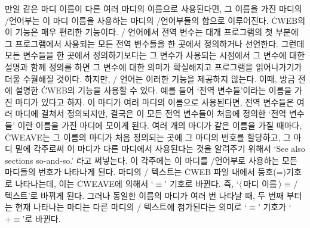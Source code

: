 만일 같은 마디 이름이 다른 여러 마디의 이름으로 사용된다면, 그
이름을 가진 마디의 \CEE/언어부는 이 마디 이름을 사용하는 마디의
\CEE/언어부들의 합으로 이루어진다. \.{CWEB}의 이 기능은 매우 편리한
기능이다. \CEE/ 언어에서 전역 변수는 대개 프로그램의 첫 부분에 그
프로그램에서 사용되는 모든 전역 변수들을 한 곳에서 정의하거나
선언한다. 그런데 모든 변수들을 한 곳에서 정의하기보다는 그 변수가
사용되는 시점에서 그 변수에 대한 설명과 함께 정의를 하면 그 변수에
대한 의미가 확실해지고 프로그램을 읽어나가기가 더울 수월해질
것이다. 하지만, \CEE/ 언어는 이러한 기능을 제공하지 않는다. 이때, 방금
전에 설명한 \.{CWEB}의 기능을 사용할 수 있다. 
예를 들어 `전역 변수들'이라는 이름을 가진 마디가 있다고 하자. 이 마디가 
여러 마디의 이름으로 사용된다면, 전역 변수들은 여러 마디에 걸쳐서
정의되지만, 결국은 이 모든 전역 변수들이 처음에 정의한 `전역 변수들'%
이란 이름을 가진 마디에 모이게 된다. 여러 개의 마디가
같은 이름을 가질 때마다, \.{CWEAVE}는 그 이름의 마디가 처음 정의되는
곳에 그 마디의 번호를 할당하고, 그 마디 밑에 각주로써 이 마디가 다른
마디에서 사용된다는 것을 알려주기 위해서 `See also sections so-and-so.'%
라고 써넣는다. 이 각주에는 이 마디를 \CEE/언어부로
사용하는 모든 마디들의 번호가 나타나게 된다. 마디의 \CEE/ 텍스트는
\.{CWEB} 파일 내에서 등호(=)기호로 나타나는데, 이는 \.{CWEAVE}에
의해서 `$\equiv$' 기호로 바뀐다. 즉, `$\langle\,$마디
이름$\,\rangle\equiv\null$\CEE/ 텍스트'로 바뀌게 된다. 그러나 동일한
이름의 마디가 여러 번 나타날 때, 두 번째 부터는 현재 나타나는 마디는
다른 마디의 \CEE/ 텍스트에 첨가된다는 의미로 `$\equiv$' 기호가
`$\mathrel+\equiv$'로 바뀐다.

